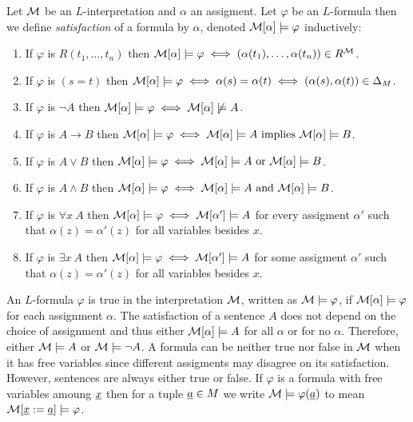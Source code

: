\documentclass[12pt]{article}
\begin{document}
\begin{definition}
Let $\mathcal{M}$ be an $L$-interpretation and $\alpha$ an assigment. Let $\varphi$ be an $L$-formula then we define \textit{satisfaction} of a formula by $\alpha$, denoted $\mathcal{M}[\alpha] \models \varphi$ inductively:
\begin{enumerate}
\item If $\varphi$ is $R(t_1, \dots, t_n)$ then $\mathcal{M}[\alpha] \models \varphi \iff (\alpha(t_1), \dots, \alpha(t_n)) \in R^{\mathcal{M}}$.
\item If $\varphi$ is $(s = t)$ then $\mathcal{M}[\alpha] \models \varphi \iff \alpha(s) = \alpha(t) \iff (\alpha(s), \alpha(t)) \in \Delta_M$. 
\item If $\varphi$ is $\neg A$ then $\mathcal{M}[\alpha] \models \varphi \iff \mathcal{M}[\alpha] \not\models A$.
\item If $\varphi$ is $A \to B$ then $\mathcal{M}[\alpha] \models \varphi \iff \mathcal{M}[\alpha] \models A \text{ implies } \mathcal{M}[\alpha] \models B$.
\item If $\varphi$ is $A \vee B$ then $\mathcal{M}[\alpha] \models \varphi \iff \mathcal{M}[\alpha] \models A \text{ or } \mathcal{M}[\alpha] \models B$.
\item If $\varphi$ is $A \wedge B$ then $\mathcal{M}[\alpha] \models \varphi \iff \mathcal{M}[\alpha] \models A \text{ and } \mathcal{M}[\alpha] \models B$.
\item If $\varphi$ is $\forall x \: A$ then $\mathcal{M}[\alpha] \models \varphi \iff \mathcal{M}[\alpha'] \models A$ for every assigment $\alpha'$ such that $\alpha(z) = \alpha'(z)$ for all variables besides $x$.
\item If $\varphi$ is $\exists x \: A$ then $\mathcal{M}[\alpha] \models \varphi \iff \mathcal{M}[\alpha'] \models A$ for some assigment $\alpha'$ such that $\alpha(z) = \alpha'(z)$ for all variables besides $x$.
\end{enumerate}
An $L$-formula $\varphi$ is true in the interpretation $\mathcal{M}$, written as $\mathcal{M} \models \varphi$, if $\mathcal{M}[\alpha] \models \varphi$ for each assignment $\alpha$. The satisfaction of a sentence $A$ does not depend on the choice of assignment and thus either $\mathcal{M}[\alpha] \models A$ for all $\alpha$ or for no $\alpha$. Therefore, either $\mathcal{M} \models A$ or $\mathcal{M} \models \neg A$. A formula can be neither true nor false in $\mathcal{M}$ when it has free variables since different assigments may disagree on its satisfaction. However, sentences are always either true or false. If $\varphi$ is a formula with free variables amoung $\underline{x}$ then for a tuple $\underline{a} \in M$ we write $\mathcal{M} \models \varphi(\underline{a})$ to mean $\mathcal{M}[\underline{x} := \underline{a}] \models \varphi$. 
\end{definition}
\end{document}
